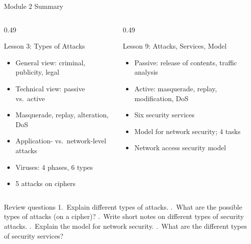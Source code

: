 \documentclass[aspectratio=169,11pt,xcolor={table}]{beamer}
\begin{document}
\begin{frame}{Module 2 Summary}
  \begin{columns}[T]
    \begin{column}{0.49\textwidth}
      \begin{block}{Lesson 3: Types of Attacks}
        \small
        \begin{itemize}\setlength{\itemsep}{0pt}
          \item General view: criminal, publicity, legal
          \item Technical view: passive vs.\ active
          \item Masquerade, replay, alteration, DoS
          \item Application- vs.\ network-level attacks
          \item Viruses: 4 phases, 6 types
          \item 5 attacks on ciphers
        \end{itemize}
      \end{block}
    \end{column}
    \begin{column}{0.49\textwidth}
      \begin{exampleblock}{Lesson 9: Attacks, Services, Model}
        \small
        \begin{itemize}\setlength{\itemsep}{0pt}
          \item Passive: release of contents, traffic analysis
          \item Active: masquerade, replay, modification, DoS
          \item Six security services
          \item Model for network security; 4 tasks
          \item Network access security model
        \end{itemize}
      \end{exampleblock}
    \end{column}
  \end{columns}
  \vspace{1mm}
  \begin{alertblock}{Review questions}
    \scriptsize
    1.~Explain different types of attacks. .~What are the possible types of attacks (on a cipher)? .~Write short notes on different types of security attacks. .~Explain the model for network security. .~What are the different types of security services?
  \end{alertblock}
\end{frame}
\end{document}
